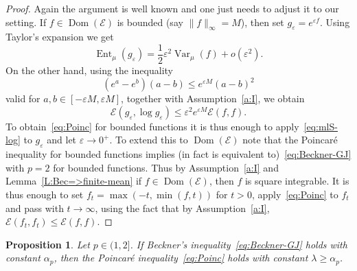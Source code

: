 \documentclass[a4paper]{amsart}
\newtheorem{proposition}[theorem]{Proposition} %
\theoremstyle{definition}
\theoremstyle{remark}
\numberwithin{equation}{section}
\DeclareMathOperator{\Dom}{Dom} %
\newcommand*{\calE}{\mathcal{E}}
\DeclareMathOperator{\Ent}{Ent}	%
\DeclareMathOperator{\Var}{Var}	%
\begin{document}
\begin{proof}
  Again the argument is well known and one just needs to adjust it to our setting. If $f \in \Dom(\calE)$ is bounded (say $\|f\|_\infty = M$), then set $g_\varepsilon = e^{\varepsilon f}$. Using Taylor's expansion we get
  \begin{displaymath}
    \Ent_\mu (g_\varepsilon) = \frac{1}{2}\varepsilon^2 \Var_\mu (f) + o(\varepsilon^2).
  \end{displaymath}
On the other hand, using the inequality
\begin{displaymath}
  (e^a - e^b)(a - b)\le e^{\varepsilon M}(a-b)^2
\end{displaymath}
valid for $a,b \in [-\varepsilon M,\varepsilon M]$, together with Assumption~\ref{a:I}, we obtain
\begin{displaymath}
  \calE(g_\varepsilon, \log g_\varepsilon) \le \varepsilon^2 e^{\varepsilon M} \calE(f,f).
\end{displaymath}
To obtain~\eqref{eq:Poinc} for bounded functions it is thus enough to apply~\eqref{eq:mlS-log} to $g_\varepsilon$ and let $\varepsilon \to 0^+$.
To extend this to $\Dom(\calE)$ note that the Poincar\'e inequality for bounded functions implies (in fact is equivalent to)~\eqref{eq:Beckner-GJ} with $p=2$ for bounded functions. Thus by Assumption~\ref{a:I} and Lemma~\ref{L:Bec=>finite-mean} if $f \in \Dom(\calE)$, then $f$ is square integrable. It is thus enough to set $f_t = \max(-t,\min(f,t))$ for $t > 0$, apply~\eqref{eq:Poinc} to $f_t$ and pass with $t\to \infty$, using the fact that by Assumption~\ref{a:I}, $\calE(f_t,f_t) \le \calE(f,f)$.
\end{proof}

\begin{proposition}
\label{prop:Bec-to-Poinc}
Let $p \in (1,2]$. If Beckner's inequality~\eqref{eq:Beckner-GJ} holds with constant $\alpha_p$, then the Poincar\'e inequality~\eqref{eq:Poinc} holds with constant $\lambda \ge \alpha_p$.
\end{proposition}
\end{document}
